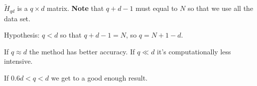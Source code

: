 $\tilde{H}_{qd}$ is a $q\times d$ matrix. \textbf{Note} that $q+d-1$ must equal to $N$ so that we use all the data set.

\begin{remark}
    Hypothesis: $q<d$ so that $q+d-1=N$, so $q=N+1-d$.

    If $q \approx d$ the method has better accuracy.
    If $q \ll d$ it's computationally less intensive.

    If $0.6d < q < d$ we get to a good enough result.
\end{remark}
